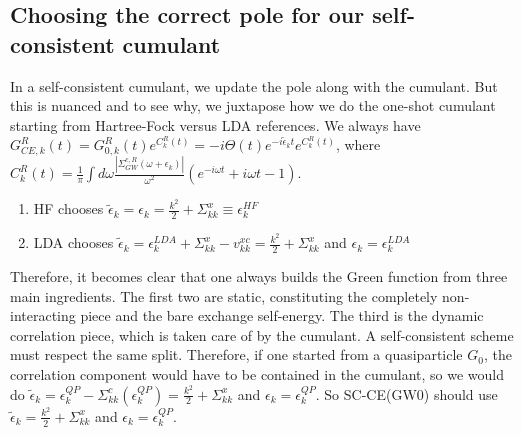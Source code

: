 \subsection{Choosing the correct pole for our self-consistent cumulant}
In a self-consistent cumulant, we update the pole along with the cumulant. But this is nuanced and to see why, we juxtapose how we do the one-shot cumulant starting from Hartree-Fock versus LDA references. We always have $G^{R}_{CE,k}(t) = G_{0,k}^R(t) e^{C_{k}^{R}(t)} = -i \Theta(t) e^{-i\tilde{\epsilon}_k t} e^{C_{k}^{R}(t)}$, where $C_{k}^R(t) = \frac{1}{\pi}\int d\omega \frac{|\Sigma_{GW}^{c,R}(\omega+\epsilon_k)|}{\omega^2} \left( e^{-i\omega t} + i\omega t - 1 \right)$. 
\begin{enumerate}
    \item HF chooses $\tilde{\epsilon}_k = \epsilon_k = \frac{k^2}{2} + \Sigma_{kk}^x \equiv \epsilon^{HF}_k$
    \item LDA chooses $\tilde{\epsilon}_k = \epsilon^{LDA}_k + \Sigma_{kk}^x - v^{xc}_{kk} = \frac{k^2}{2} + \Sigma_{kk}^x$ and $\epsilon_k = \epsilon^{LDA}_k$
\end{enumerate}
Therefore, it becomes clear that one always builds the Green function from three main ingredients. The first two are static, constituting the completely non-interacting piece and the bare exchange self-energy. The third is the dynamic correlation piece, which is taken care of by the cumulant. A self-consistent scheme must respect the same split. Therefore, if one started from a quasiparticle $G_0$, the correlation component would have to be contained in the cumulant, so we would do $\tilde{\epsilon}_k = \epsilon^{QP}_k - \Sigma_{kk}^c(\epsilon^{QP}_k)= \frac{k^2}{2} + \Sigma_{kk}^x$ and $\epsilon_k = \epsilon^{QP}_k$. So SC-CE(GW0) should use $\tilde{\epsilon}_k = \frac{k^2}{2} + \Sigma_{kk}^x$ and $\epsilon_k = \epsilon^{QP}_k$.
